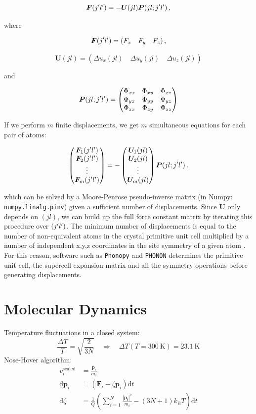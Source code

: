 \[ \bm{F}(j^\prime l^\prime) = -\bm{U}(jl) \bm{P} (jl;j^\prime l^\prime) \, , \]

\noindent where

\[ \bm{F}(j^\prime l^\prime) = (F_x \quad F_y \quad F_z) \, , \]

\[ \bm{U}(jl) = \left( \Delta u_x(jl) \quad \Delta u_y(jl) \quad \Delta u_z(jl) \right)  \]

\noindent and

\[ 
\bm{P} (jl;j^\prime l^\prime) = 	
\begin{pmatrix}
\Phi_{xx} & \Phi_{xy} & \Phi_{xz} \\
\Phi_{yx} & \Phi_{yy} & \Phi_{yz} \\
\Phi_{zx} & \Phi_{zy} & \Phi_{zz} 
\end{pmatrix}
\]

\noindent If we perform $m$ finite displacements, we get $m$ simultaneous equations for each pair of atoms:

\begin{equation*}
\begin{pmatrix} \bm{F}_1(j^\prime l^\prime) \\ \bm{F}_2(j^\prime l^\prime) \\ \vdots \\ \bm{F}_m(j^\prime l^\prime) \end{pmatrix} =
- \begin{pmatrix} \bm{U}_1(jl) \\ \bm{U}_2(jl) \\ \vdots \\ \bm{U}_m(jl) \end{pmatrix} \bm{P}(jl;j^\prime l^\prime) \, .
\end{equation*}

\noindent which can be solved by a Moore-Penrose pseudo-inverse matrix (in Numpy: \texttt{numpy.linalg.pinv}) given a sufficient number of displacements. Since $\bm{U}$ only depends on $(jl)$, we can build up the full force constant matrix by iterating this procedure over $(j^\prime l^\prime)$. The minimum number of displacements is equal to the number of non-equivalent atoms in the crystal primitive unit cell multiplied by a number of independent x,y,z coordinates in the site symmetry of a given atom \cite{Parlinski1997}. For this reason, software such as \texttt{Phonopy} and \texttt{PHONON} determines the primitive unit cell, the supercell expansion matrix and all the symmetry operations before generating displacements.

\section{Molecular Dynamics}\label{sec:method_md}
Temperature fluctuations in a closed system:
%
\[ \frac{\Delta T}{T} = \sqrt{\frac{2}{3N}} \quad \Rightarrow \quad \Delta T(T=\SI{300}{\kelvin}) = \SI{23.1}{\kelvin} \]
%
Nose-Hover algorithm:
%
\begin{align*}
v_i^\text{scaled} &= \frac{\bm{p}_i}{m_i} \\
\text{d}\bm{p}_i &= (\bm{F}_i - \zeta \bm{p}_i) \text{d}t \\
\text{d}\zeta &= \frac{1}{Q} \left( \sum_{i=1}^N \frac{|\bm{p_i}|^2}{m_i} - (3N+1)k_\text{B}T\right) \text{d}t
\end{align*}

